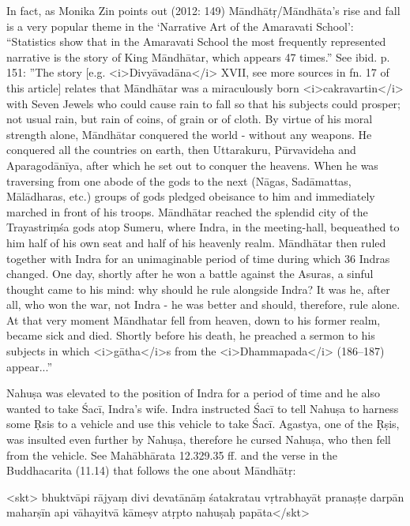 {                 In fact, as Monika Zin points out (2012: 149) Māndhātṛ/Māndhāta's rise and fall is a very popular theme                 in the `Narrative Art of the Amaravati School':                  ``Statistics show that in the Amaravati School the most frequently represented narrative is                   the story of King Māndhātar, which appears 47 times.''         See ibid. p. 151:         ''The story [e.g. <i>Divyāvadāna</i> XVII, see more sources in fn. 17 of this article]          relates that Māndhātar was a miraculously born <i>cakravartin</i> with Seven         Jewels who could cause rain to fall so that his subjects could prosper; not usual rain, but rain         of coins, of grain or of cloth. By virtue of his moral strength alone, Māndhātar conquered the world -         without any weapons. He conquered all the countries on earth, then Uttarakuru,         Pūrvavideha and Aparagodānīya, after which he set out to conquer the heavens. When he was         traversing from one abode of the gods to the next (Nāgas, Sadāmattas, Mālādharas, etc.)         groups of gods pledged obeisance to him and immediately marched in front of his troops.         Māndhātar reached the splendid city of the Trayastriṃśa gods atop Sumeru, where Indra, in         the meeting-hall, bequeathed to him half of his own seat and half of his heavenly realm.         Māndhātar then ruled together with Indra for an unimaginable period of time during which 36         Indras changed. One day, shortly after he won a battle against the Asuras, a sinful thought         came to his mind: why should he rule alongside Indra? It was he, after all, who won the war,         not Indra - he was better and should, therefore, rule alone.         At that very moment Māndhatar fell from heaven, down to his former realm, became sick and died.         Shortly before his death, he preached a sermon to his subjects in which <i>gātha</i>s          from the <i>Dhammapada</i> (186--187) appear...''                   

                 Nahuṣa was elevated to the position of Indra for a period of time and he also wanted                 to take Śacī, Indra's wife. Indra instructed Śacī to tell Nahuṣa to                  harness some Ṛsis to a vehicle and use this vehicle to take Śacī.                  Agastya, one of the Ṛṣis, was insulted even further by Nahuṣa, therefore                 he cursed Nahuṣa, who then fell from the vehicle. See Mahābhārata 12.329.35 ff. and                 the verse in the Buddhacarita (11.14) that follows the one about Māndhātṛ:         

                                 <skt>        bhuktvāpi rājyaṃ divi devatānāṃ   
                                                 śatakratau vṛtrabhayāt pranaṣṭe\danda
                                              darpān maharṣīn api vāhayitvā  
                                                 kāmeṣv atṛpto nahuṣaḥ papāta\twodanda</skt>                  }





